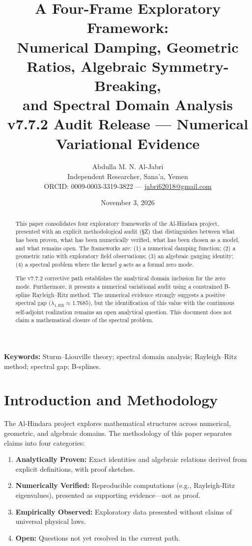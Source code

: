 \documentclass[12pt,a4paper]{article}
\title{A Four-Frame Exploratory Framework:\\
Numerical Damping, Geometric Ratios, Algebraic Symmetry-Breaking,\\
and Spectral Domain Analysis\\
\large v7.7.2 Audit Release — Numerical Variational Evidence}
\author{Abdulla M. N. Al-Jabri\\ Independent Researcher, Sana'a, Yemen\\ ORCID: 0009-0003-3319-3822 --- \href{mailto:jabri62018@gmail.com}{jabri62018@gmail.com}}
\date{November 3, 2026}
\begin{document}
\maketitle
\thispagestyle{empty}

\begin{abstract}
This paper consolidates four exploratory frameworks of the Al-Hindara project, presented with an explicit methodological audit (\S Z) that distinguishes between what has been proven, what has been numerically verified, what has been chosen as a model, and what remains open. 
The frameworks are: (1) a numerical damping function; (2) a geometric ratio with exploratory field observations; (3) an algebraic gauging identity; (4) a spectral problem where the kernel $g$ acts as a formal zero mode.

The v7.7.2 corrective path establishes the analytical domain inclusion for the zero mode. Furthermore, it presents a numerical variational audit using a constrained B-spline Rayleigh--Ritz method. The numerical evidence strongly suggests a positive spectral gap ($\lambda_{1,\mathrm{RR}} \approx 1.7685$), but the identification of this value with the continuous self-adjoint realization remains an open analytical question. This document does not claim a mathematical closure of the spectral problem.
\end{abstract}

\noindent\textbf{Keywords:} Sturm--Liouville theory; spectral domain analysis; Rayleigh--Ritz method; spectral gap; B-splines.

\tableofcontents
\vspace{0.5cm}

\section{Introduction and Methodology}\label{sec:intro}

The Al-Hindara project explores mathematical structures across numerical, geometric, and algebraic domains. The methodology of this paper separates claims into four categories:
\begin{enumerate}
\item \textbf{Analytically Proven:} Exact identities and algebraic relations derived from explicit definitions, with proof sketches.
\item \textbf{Numerically Verified:} Reproducible computations (e.g., Rayleigh-Ritz eigenvalues), presented as supporting evidence—not as proof.
\item \textbf{Empirically Observed:} Exploratory data presented without claims of universal physical laws.
\item \textbf{Open:} Questions not yet resolved in the current path.
\end{enumerate}
\end{document}

